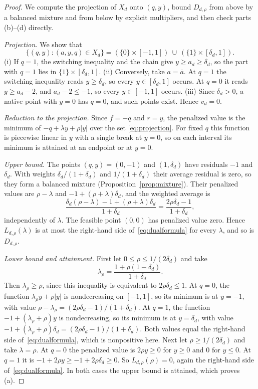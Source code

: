 \begin{proof}
We compute the projection of $X_d$ onto $(q,y)$, bound $D_{d,\rho}$ from
above by a balanced mixture and from below by explicit multipliers, and
then check parts (b)--(d) directly.

\emph{Projection.} We show that
\begin{equation}\label{eq:projection}
 \{(q,y):(a,y,q)\in X_d\}
 =(\{0\}\times[-1,1])\ \cup\ (\{1\}\times[\delta_d,1]).
\end{equation}
(i) If $q=1$, the switching inequality and the chain give
$y\ge a_d\ge\delta_d$, so the part with $q=1$ lies in
$\{1\}\times[\delta_d,1]$. (ii) Conversely, take $a=\bar a$. At $q=1$ the
switching inequality reads $y\ge\delta_d$, so every $y\in[\delta_d,1]$
occurs. At $q=0$ it reads $y\ge a_d-2$, and $a_d-2\le-1$, so every
$y\in[-1,1]$ occurs. (iii) Since $\delta_d>0$, a native point with $y=0$
has $q=0$, and such points exist. Hence $v_d=0$.

\emph{Reduction to the projection.} Since $f=-q$ and $r=y$, the penalized
value is the minimum of $-q+\lambda y+\rho|y|$ over the set
\eqref{eq:projection}. For fixed $q$ this function is piecewise linear in
$y$ with a single break at $y=0$, so on each interval its minimum is
attained at an endpoint or at $y=0$.

\emph{Upper bound.} The points $(q,y)=(0,-1)$ and $(1,\delta_d)$ have
residuals $-1$ and $\delta_d$. With weights $\delta_d/(1+\delta_d)$ and
$1/(1+\delta_d)$ their average residual is zero, so they form a balanced
mixture (Proposition~\ref{prop:mixture}). Their penalized values are
$\rho-\lambda$ and $-1+(\rho+\lambda)\delta_d$, and the weighted average is
\[
 \frac{\delta_d(\rho-\lambda)-1+(\rho+\lambda)\delta_d}{1+\delta_d}
 =\frac{2\rho\delta_d-1}{1+\delta_d},
\]
independently of $\lambda$. The feasible point $(0,0)$ has penalized value
zero. Hence $L_{d,\rho}(\lambda)$ is at most the right-hand side
of~\eqref{eq:dualformula} for every $\lambda$, and so is $D_{d,\rho}$.

\emph{Lower bound and attainment.} First let $0\le\rho\le1/(2\delta_d)$
and take
\[
 \lambda_\rho=\frac{1+\rho(1-\delta_d)}{1+\delta_d}.
\]
Then $\lambda_\rho\ge\rho$, since this inequality is equivalent to
$2\rho\delta_d\le1$. At $q=0$, the function $\lambda_\rho y+\rho|y|$ is
nondecreasing on $[-1,1]$, so its minimum is at $y=-1$, with value
$\rho-\lambda_\rho=(2\rho\delta_d-1)/(1+\delta_d)$. At $q=1$, the
function $-1+(\lambda_\rho+\rho)y$ is nondecreasing, so its minimum is at
$y=\delta_d$, with value
$-1+(\lambda_\rho+\rho)\delta_d=(2\rho\delta_d-1)/(1+\delta_d)$. Both
values equal the right-hand side of~\eqref{eq:dualformula}, which is
nonpositive here. Next let $\rho\ge1/(2\delta_d)$ and take $\lambda=\rho$.
At $q=0$ the penalized value is $2\rho y\ge0$ for $y\ge0$ and $0$ for
$y\le0$. At $q=1$ it is $-1+2\rho y\ge-1+2\rho\delta_d\ge0$. So
$L_{d,\rho}(\rho)=0$, again the right-hand side of~\eqref{eq:dualformula}. In
both cases the upper bound is attained, which proves (a).


\end{proof}
